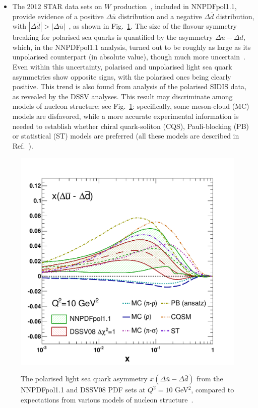 \begin{itemize}
\item The 2012 STAR data sets on $W$ production~\cite{Adamczyk:2014xyw}, 
included in NNPDFpol1.1, provide evidence of a positive 
$\Delta\bar{u}$ distribution 
and a negative $\Delta\bar{d}$ distribution, with 
$|\Delta\bar{d}|>|\Delta\bar{u}|$~\cite{Nocera:2014gqa},
as shown in Fig.~\ref{fig:RHICpdfs1}.
% 
The size of the flavour symmetry breaking for polarised sea quarks is 
quantified by the asymmetry $\Delta\bar{u}-\Delta\bar{d}$, which,
in the NNPDFpol1.1 analysis, turned out to be roughly as large as its 
unpolarised counterpart (in absolute value), 
though much more uncertain~\cite{Nocera:2014rea}. 
%
Even within this uncertainty, polarised and unpolarised light sea quark 
asymmetries show opposite signs,
with the polarised ones being clearly positive.  This trend is also found
from analysis of the polarised SIDIS data, as revealed by the DSSV analyses. 
%
This result may discriminate among models of nucleon structure; 
see Fig.~\ref{fig:RHICpdfs1}: 
specifically, some meson-cloud (MC) models are disfavored, while a more 
accurate experimental information is needed to establish whether 
chiral quark-soliton (CQS), Pauli-blocking (PB) or statistical (ST)
models are preferred (all these models are described in 
Ref.~\cite{Chang:2014jba}).

\end{itemize}

\begin{figure}[!h]
\centering
\includegraphics[scale=0.35]{plots/asysea_2}\\
\caption{\small The polarised light sea quark asymmetry 
$x(\Delta\bar{u}-\Delta\bar{d})$ from the NNPDFpol1.1 and 
DSSV08 PDF sets at $Q^2=10$ GeV$^2$, compared to expectations from 
various models of nucleon structure~\cite{Chang:2014jba}.}
\label{fig:RHICpdfs1}
\end{figure}

